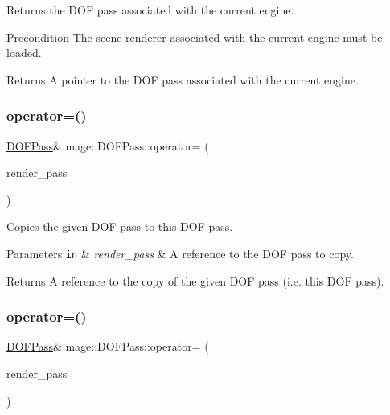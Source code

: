 Returns the D\+OF pass associated with the current engine.

\begin{DoxyPrecond}{Precondition}
The scene renderer associated with the current engine must be loaded. 
\end{DoxyPrecond}
\begin{DoxyReturn}{Returns}
A pointer to the D\+OF pass associated with the current engine. 
\end{DoxyReturn}
\hypertarget{classmage_1_1_d_o_f_pass_ab708ec4fdf564d5ce38453e7d46d04d8}{}\label{classmage_1_1_d_o_f_pass_ab708ec4fdf564d5ce38453e7d46d04d8} 
\subsubsection{\texorpdfstring{operator=()}{operator=()}\hspace{0.1cm}{\footnotesize\ttfamily [1/2]}}
{\footnotesize\ttfamily \hyperlink{classmage_1_1_d_o_f_pass}{D\+O\+F\+Pass}\& mage\+::\+D\+O\+F\+Pass\+::operator= (\begin{DoxyParamCaption}\item[{const \hyperlink{classmage_1_1_d_o_f_pass}{D\+O\+F\+Pass} \&}]{render\+\_\+pass }\end{DoxyParamCaption})\hspace{0.3cm}{\ttfamily [delete]}}

Copies the given D\+OF pass to this D\+OF pass.


\begin{DoxyParams}[1]{Parameters}
\mbox{\tt in}  & {\em render\+\_\+pass} & A reference to the D\+OF pass to copy. \\
\hline
\end{DoxyParams}
\begin{DoxyReturn}{Returns}
A reference to the copy of the given D\+OF pass (i.\+e. this D\+OF pass). 
\end{DoxyReturn}
\hypertarget{classmage_1_1_d_o_f_pass_a8547ec1bb4e56faf3299e0793566b785}{}\label{classmage_1_1_d_o_f_pass_a8547ec1bb4e56faf3299e0793566b785} 
\subsubsection{\texorpdfstring{operator=()}{operator=()}\hspace{0.1cm}{\footnotesize\ttfamily [2/2]}}
{\footnotesize\ttfamily \hyperlink{classmage_1_1_d_o_f_pass}{D\+O\+F\+Pass}\& mage\+::\+D\+O\+F\+Pass\+::operator= (\begin{DoxyParamCaption}\item[{\hyperlink{classmage_1_1_d_o_f_pass}{D\+O\+F\+Pass} \&\&}]{render\+\_\+pass }\end{DoxyParamCaption})\hspace{0.3cm}{\ttfamily [delete]}}


